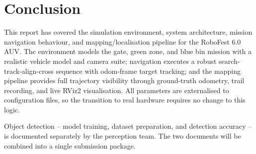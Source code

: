 \documentclass[11pt,a4paper]{article}
\begin{document}
\section{Conclusion}

This report has covered the simulation environment, system architecture,
mission navigation behaviour, and mapping/localisation pipeline for the
RoboFest 6.0 AUV. The environment models the gate, green zone, and blue bin
mission with a realistic vehicle model and camera suite; navigation executes
a robust search-track-align-cross sequence with odom-frame target tracking;
and the mapping pipeline provides full trajectory visibility through
ground-truth odometry, trail recording, and live RViz2 visualisation. All
parameters are externalised to configuration files, so the transition to
real hardware requires no change to this logic.

\begin{infobox}[title={Companion Document}]
Object detection -- model training, dataset preparation, and detection
accuracy -- is documented separately by the perception team. The two
documents will be combined into a single submission package.
\end{infobox}
\end{document}
